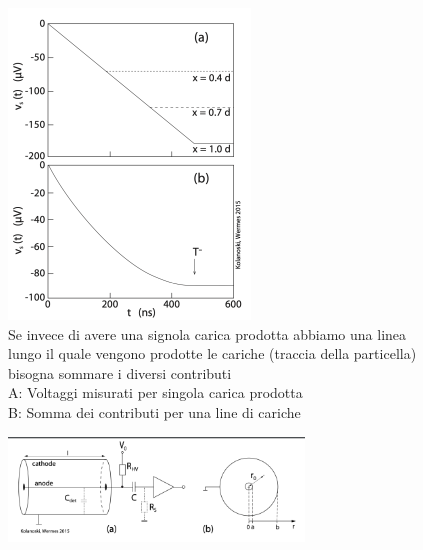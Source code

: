 \begin{minipage}{0.48\textwidth}
    \vspace{3pt}
    \begin{figure}[H]
        \centering
        \includegraphics[width=\textwidth,frame]{Chapters/images/Interazione_radiazione_materia/image-20220223212235264.png}
        \captionsetup{width=\textwidth}
        \vspace{-19pt}
        \caption{Se invece di avere una signola carica prodotta abbiamo una linea lungo il quale vengono prodotte le cariche (traccia della particella) bisogna sommare i diversi contributi\\ A: Voltaggi misurati per singola carica prodotta\\ B: Somma dei contributi per una line di cariche}
        \label{fig:}
    \end{figure}

\end{minipage}
\begin{figure}[H]
    \centering
    \includegraphics[width=0.7\textwidth,frame]{Chapters/images/Interazione_radiazione_materia/image-20220223212504142.png}

\end{figure}
